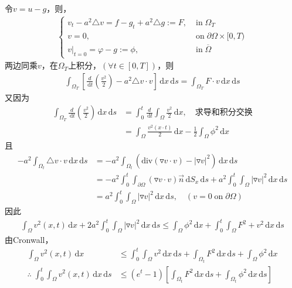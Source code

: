 \documentclass[11pt, a4paper]{article}
\theoremstyle{theorem}
\newcommand{\intd}[1]{\,\mathrm{d}{#1}}
\begin{document}
令$v = u - g$，则，
\begin{align}
\label{Q4-9-2}
  \begin{cases}
    v_t - a^2 \triangle v = f - g_t + a^2 \triangle g := F, \; &\text{in} \; \Omega_T \\
    v = 0, \; &\text{on} \; \partial \Omega \times [0,T) \\
    v \bigg|_{t = 0} = \varphi - g := \phi, \; &\text{in} \; \overline{\Omega}
  \end{cases}
\end{align}
两边同乘$v$，在$\Omega_T$上积分，$\left(\forall t \in [0,T]\right)$，则
\begin{align*}
    \int_{\Omega_T} \left[\frac{d}{\intd t}\left(\frac{v^2}{2}\right) - a^2 \triangle v \cdot v\right] \intd x \intd s = \int_{\Omega_T} F \cdot v \intd x \intd s
\end{align*}
又因为
\begin{align*}
    \int_{\Omega_T} \frac{d}{\intd t}\left(\frac{v^2}{2}\right) \intd x \intd s
    &= \int_0^t \frac{d}{\intd t} \int_\Omega \frac{v^2}{2} \intd x, \quad \text{求导和积分交换} \\
    &= \int_\Omega \frac{v^2(x \cdot t)}{2} \intd x - \frac{1}{2} \int_\Omega \phi^2 \intd x
\end{align*}
且
\begin{align*}
    - a^2 \int_{\Omega_t} \triangle v \cdot v \intd x \intd s
    &= -a^2 \int_{\Omega_t} \left(\mathrm{div}(\triangledown v \cdot v) - |\triangledown v|^2\right) \intd x \intd s \\
    &= -a^2 \int_0^t \int_{\partial \Omega} (\triangledown v \cdot v) \vec{n} \intd S_x \intd s + a^2 \int_0^t \int_\Omega |\triangledown v|^2 \intd x \intd s \\
    &= a^2 \int_0^t \int_\Omega |\triangledown v|^2 \intd x \intd s, \quad (v = 0 \; \text{on} \; \partial \Omega)
\end{align*}
因此
\begin{align*}
    \int_\Omega v^2(x,t) \intd x + 2 a^2 \int_0^t \int_\Omega |\triangledown v|^2 \intd x \intd s \leq \int_\Omega \phi^2 \intd x + \int_0^t \int_\Omega F^2 + v^2 \intd x \intd s
\end{align*}
由Cronwall，
\begin{align*}
    \int_\Omega v^2(x,t) \intd x &\leq \int_0^t \int_\Omega v^2 \intd x \intd s + \int_{\Omega_t} F^2 \intd x \intd s + \int_\Omega \phi^2 \intd x \\
    \therefore \; \int_0^t \int_\Omega v^2(x,t) \intd x \intd s &\leq (e^t - 1) \left[\int_{\Omega_t} F^2 \intd x \intd s + \int_{\Omega_t} \phi^2 \intd x \intd s \right]
\end{align*}
\end{document}
